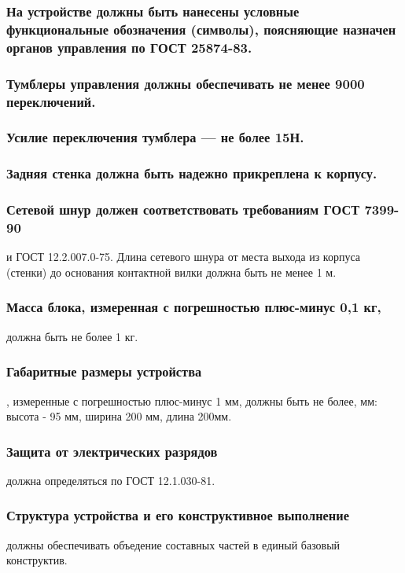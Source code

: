 \documentclass[a4paper]{bsuir-tor}
\begin{document}
  \subsubsection{На устройстве должны быть нанесены условные функциональные 
  обозначения (символы), поясняющие назначен органов управления
  по ГОСТ 25874-83.}
  
  \subsubsection{Тумблеры управления
  должны обеспечивать не менее 9000 переключений.}
  
  \subsubsection{Усилие переключения тумблера — не более 15Н.}
  
  \subsubsection{Задняя стенка должна быть надежно прикреплена к корпусу.}

  \subsubsection{Сетевой шнур должен соответствовать требованиям ГОСТ 7399-90}
  и ГОСТ 12.2.007.0-75. Длина сетевого шнура от места выхода из корпуса
  (стенки) до основания контактной вилки должна быть не менее 1 м.
  
  \subsubsection{Масса блока, измеренная с погрешностью плюс-минус 0,1 кг,}
  должна быть не более 1 кг.
  
  \subsubsection{Габаритные размеры устройства},
  измеренные с погрешностью плюс-минус 1 мм, должны быть не более, мм:
  высота - 95 мм, ширина 200 мм, длина 200мм.

  \subsubsection{Защита от электрических разрядов}
  должна определяться по ГОСТ 12.1.030-81.

  \subsubsection{Структура устройства и его конструктивное выполнение}
  должны обеспечивать объедение составных частей в единый базовый
  конструктив.
\end{document}
